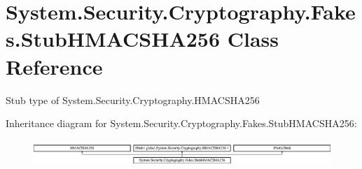 \hypertarget{class_system_1_1_security_1_1_cryptography_1_1_fakes_1_1_stub_h_m_a_c_s_h_a256}{\section{System.\-Security.\-Cryptography.\-Fakes.\-Stub\-H\-M\-A\-C\-S\-H\-A256 Class Reference}
\label{class_system_1_1_security_1_1_cryptography_1_1_fakes_1_1_stub_h_m_a_c_s_h_a256}
}


Stub type of System.\-Security.\-Cryptography.\-H\-M\-A\-C\-S\-H\-A256 


Inheritance diagram for System.\-Security.\-Cryptography.\-Fakes.\-Stub\-H\-M\-A\-C\-S\-H\-A256\-:\begin{figure}[H]
\begin{center}
\leavevmode
\includegraphics[height=1.003584cm]{class_system_1_1_security_1_1_cryptography_1_1_fakes_1_1_stub_h_m_a_c_s_h_a256}
\end{center}
\end{figure}
